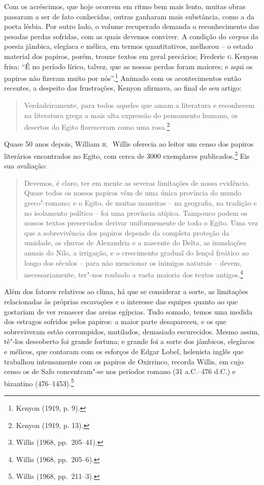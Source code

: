 Com os acréscimos, que hoje ocorrem em ritmo bem mais lento,
muitas obras passaram a ser de fato conhecidas, outras ganharam mais
substância, como a da poeta lésbia. Por outro lado, o volume recuperado demanda
o reconhecimento das pesadas perdas sofridas, com as quais devemos conviver. A
condição do \textit{corpus} da poesia jâmbica, elegíaca e mélica, em termos
quantitativos, melhorou -- o estado material dos papiros, porém, trouxe textos
em geral precários; Frederic \textsc{g}.\,Kenyon frisa:
“É no período lírico, talvez, que as nossas perdas foram maiores; e aqui os
papiros não fizeram muito por nós”.\footnote{ Kenyon (1919, p. 9).} Animado com os acontecimentos então
recentes, a despeito das frustrações, Kenyon afirmava, ao final de seu
artigo: 

\begin{quote}
Verdadeiramente, para todos aqueles que amam a literatura e reconhecem
na literatura grega a mais alta expressão do pensamento humano, os desertos do
Egito floresceram como uma rosa.\footnote{ Kenyon (1919, p. 13).}
\end{quote}


Quase 50 anos depois, William \textsc{h}.~\,Willis oferecia ao
leitor um censo dos papiros literários encontrados no Egito, com cerca de 3000
exemplares publicados.\footnote{ Willis (1968, pp.~205--41).} Eis sua avaliação: 

\begin{quote}
Devemos, é claro, ter em mente as severas limitações de nossa evidência. Quase
todos os nossos papiros vêm de uma única província do mundo greco"-romano; e o
Egito, de muitas maneiras -- na geografia, na tradição e no isolamento político
-- foi uma província atípica. Tampouco podem os nossos textos preservados
derivar uniformemente de todo o Egito. Uma vez que a sobrevivência dos papiros
depende da completa proteção da umidade, as chuvas de Alexandria e a nascente
do Delta, as inundações anuais do Nilo, a irrigação, e o crescimento gradual do
lençol freático ao longo dos séculos -- para não mencionar os inimigos naturais
-- devem, necessariamente, ter"-nos roubado a vasta maioria dos textos antigos.\footnote{ Willis (1968, pp.~205--6).}
\end{quote}

Além dos fatores relativos ao clima, há que se considerar a sorte, as limitações
relacionadas às próprias escavações e o interesse das equipes quanto ao que
gostariam de ver renascer das areias egípcias. Tudo somado, temos uma medida
dos estragos sofridos pelos papiros: a maior parte desapareceu, e os que
sobreviveram estão corrompidos, mutilados, demasiado escurecidos. Mesmo assim,
tê"-los descoberto foi grande fortuna; e grande foi a sorte dos jâmbicos,
elegíacos e mélicos, que contaram com os esforços de Edgar Lobel, helenista
inglês que trabalhou intensamente com os papiros de Oxirrinco, recorda Willis,
em cujo censo os de Safo concentram"-se nos períodos
romano (31 a.C.--476 d.C.) e bizantino (476--1453).\footnote{ Willis (1968, pp.~211--3).}

